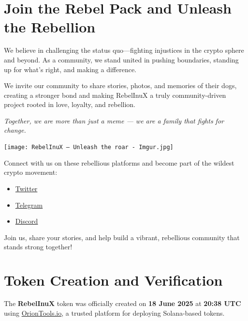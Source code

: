 \documentclass{article}
\begin{document}
\section[
\texorpdfstring{\color{primaryColor}Join the Rebel Pack and Unleash the Rebellion}{Join the Rebel Pack and Unleash the Rebellion}
]{\color{primaryColor}\textbf{Join the Rebel Pack and Unleash the Rebellion}}

We believe in challenging the status quo—fighting injustices in the crypto sphere and beyond. As a community, we stand united in pushing boundaries, standing up for what's right, and making a difference.

We invite our community to share stories, photos, and memories of their dogs, creating a stronger bond and making RebelInuX a truly community-driven project rooted in love, loyalty, and rebellion.

\textit{Together, we are more than just a meme — we are a family that fights for change.}

\vspace{0.5em}

\begin{center}
  \texttt{[image: RebelInuX — Unleash the roar - Imgur.jpg]}
\end{center}

\vspace{0.5em}

Connect with us on these rebellious platforms and become part of the wildest crypto movement:

\begin{itemize}
  \item \href{https://x.com/RebelInuX}{Twitter}
  \item \href{https://t.me/+bNrP-ozjM501YWVk}{Telegram}
  \item \href{https://discord.gg/3gBzGY6j}{Discord}
\end{itemize}

Join us, share your stories, and help build a vibrant, rebellious community that stands strong together!


\section[
\texorpdfstring{\color{primaryColor}Token Creation and Verification}{Token Creation and Verification}
]{\color{primaryColor}\textbf{Token Creation and Verification}}

\noindent
The \textbf{RebelInuX} token was officially created on \textbf{18 June 2025} at \textbf{20:38 UTC} using \href{https://oriontools.io}{OrionTools.io}, a trusted platform for deploying Solana-based tokens.
\end{document}
